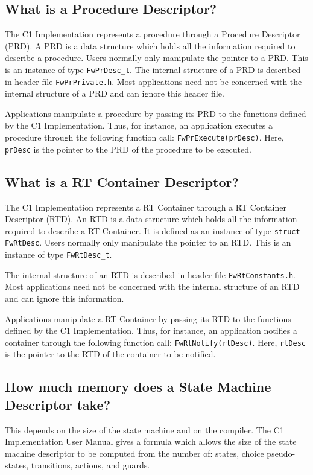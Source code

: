 \documentclass[a4paper,10pt]{article}
\begin{document}
\subsection{What is a Procedure Descriptor?}\label{faq:PRD}
The C1 Implementation represents a procedure through a Procedure Descriptor (PRD). A PRD is a data structure which holds all the information required 
to describe a procedure. Users normally only manipulate the pointer to a PRD. This is an instance of type \texttt{FwPrDesc\_t}. The internal structure of a PRD is described in header file \texttt{FwPrPrivate.h}. Most applications need not be concerned with the internal structure of a PRD and can ignore this header file.

Applications manipulate a procedure by passing its PRD to the functions defined by the C1 Implementation. Thus, for instance, an application executes 
a procedure through the following function call: \texttt{FwPrExecute(prDesc)}. Here, \texttt{prDesc} is the pointer to the PRD of the procedure to be executed.

\subsection{What is a RT Container Descriptor?}\label{faq:RTD}
The C1 Implementation represents a RT Container through a RT Container Descriptor (RTD). An RTD is a data structure which holds all the information required to describe a RT Container. It is defined as an instance of type \texttt{struct FwRtDesc}. Users normally only manipulate the pointer to an RTD. This is an instance of type \texttt{FwRtDesc\_t}. 

The internal structure of an RTD is described in header file \texttt{FwRtConstants.h}. 
Most applications need not be concerned with the internal structure of an RTD and can ignore this information.

Applications manipulate a RT Container by passing its RTD to the functions defined by the C1 Implementation. Thus, for instance, an application notifies a container through the following function call: \texttt{FwRtNotify(rtDesc)}. Here, \texttt{rtDesc} is the pointer to the RTD of the container to be notified.

\subsection{How much memory does a State Machine Descriptor take?}
This depends on the size of the state machine and on the compiler. The C1 Implementation User Manual gives a formula which allows the size of the state machine descriptor to be computed from the number of: states, choice pseudo-states, 
transitions, actions, and guards.
\end{document}
